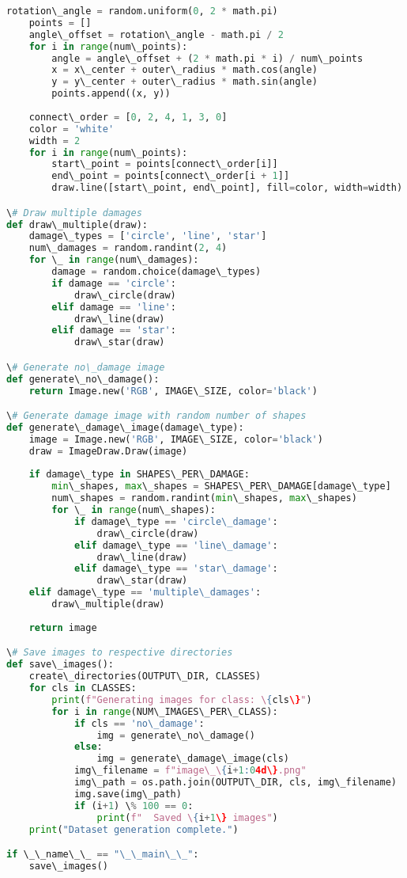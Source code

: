\documentclass{article}
\begin{document}
\begin{lstlisting}[language=Python]
    rotation\_angle = random.uniform(0, 2 * math.pi)
    points = []
    angle\_offset = rotation\_angle - math.pi / 2
    for i in range(num\_points):
        angle = angle\_offset + (2 * math.pi * i) / num\_points
        x = x\_center + outer\_radius * math.cos(angle)
        y = y\_center + outer\_radius * math.sin(angle)
        points.append((x, y))
    
    connect\_order = [0, 2, 4, 1, 3, 0]
    color = 'white'
    width = 2
    for i in range(num\_points):
        start\_point = points[connect\_order[i]]
        end\_point = points[connect\_order[i + 1]]
        draw.line([start\_point, end\_point], fill=color, width=width)

\# Draw multiple damages
def draw\_multiple(draw):
    damage\_types = ['circle', 'line', 'star']
    num\_damages = random.randint(2, 4)
    for \_ in range(num\_damages):
        damage = random.choice(damage\_types)
        if damage == 'circle':
            draw\_circle(draw)
        elif damage == 'line':
            draw\_line(draw)
        elif damage == 'star':
            draw\_star(draw)

\# Generate no\_damage image
def generate\_no\_damage():
    return Image.new('RGB', IMAGE\_SIZE, color='black')

\# Generate damage image with random number of shapes
def generate\_damage\_image(damage\_type):
    image = Image.new('RGB', IMAGE\_SIZE, color='black')
    draw = ImageDraw.Draw(image)
    
    if damage\_type in SHAPES\_PER\_DAMAGE:
        min\_shapes, max\_shapes = SHAPES\_PER\_DAMAGE[damage\_type]
        num\_shapes = random.randint(min\_shapes, max\_shapes)
        for \_ in range(num\_shapes):
            if damage\_type == 'circle\_damage':
                draw\_circle(draw)
            elif damage\_type == 'line\_damage':
                draw\_line(draw)
            elif damage\_type == 'star\_damage':
                draw\_star(draw)
    elif damage\_type == 'multiple\_damages':
        draw\_multiple(draw)
    
    return image

\# Save images to respective directories
def save\_images():
    create\_directories(OUTPUT\_DIR, CLASSES)
    for cls in CLASSES:
        print(f"Generating images for class: \{cls\}")
        for i in range(NUM\_IMAGES\_PER\_CLASS):
            if cls == 'no\_damage':
                img = generate\_no\_damage()
            else:
                img = generate\_damage\_image(cls)
            img\_filename = f"image\_\{i+1:04d\}.png"
            img\_path = os.path.join(OUTPUT\_DIR, cls, img\_filename)
            img.save(img\_path)
            if (i+1) \% 100 == 0:
                print(f"  Saved \{i+1\} images")
    print("Dataset generation complete.")

if \_\_name\_\_ == "\_\_main\_\_":
    save\_images()

\end{lstlisting}
\end{document}
